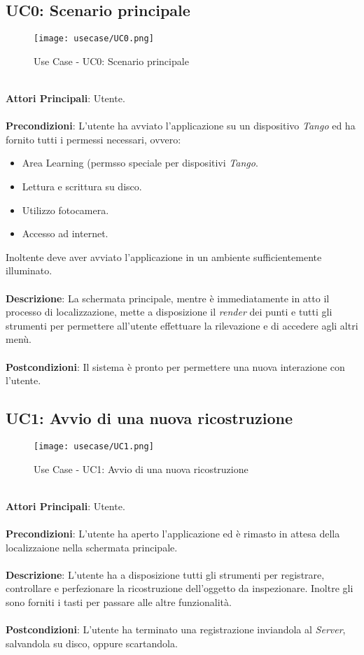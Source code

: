 \subsection{UC0: Scenario principale}
\begin{figure}[!h] 
    \centering 
    \texttt{[image: usecase/UC0.png]} 
    \caption{Use Case - UC0: Scenario principale}
\end{figure}
\ \\
\textbf{Attori Principali}: Utente.
\\\\ \textbf{Precondizioni}: L'utente ha avviato l'applicazione su un dispositivo \emph{Tango} ed ha fornito tutti i permessi necessari, ovvero:
\begin{itemize}
	\item Area Learning (permsso speciale per dispositivi \emph{Tango}.
	\item Lettura e scrittura su disco.
	\item Utilizzo fotocamera.
	\item Accesso ad internet.
\end{itemize}
Inoltente deve aver avviato l'applicazione in un ambiente sufficientemente illuminato.
\\\\ \textbf{Descrizione}: La schermata principale, mentre è immediatamente in atto il processo di localizzazione, mette a disposizione il \emph{render} dei punti e tutti gli strumenti per permettere all'utente effettuare la rilevazione e di accedere agli altri menù.
\\\\ \textbf{Postcondizioni}: Il sistema è pronto per permettere una nuova interazione con l'utente.


\subsection{UC1: Avvio di una nuova ricostruzione}
\begin{figure}[!h] 
    \centering 
    \texttt{[image: usecase/UC1.png]} 
    \caption{Use Case - UC1: Avvio di una nuova ricostruzione}
\end{figure}
\ \\
\textbf{Attori Principali}: Utente.
\\\\ \textbf{Precondizioni}: L'utente ha aperto l'applicazione ed è rimasto in attesa della localizzaione nella schermata principale.
\\\\ \textbf{Descrizione}: L'utente ha a disposizione tutti gli strumenti per registrare, controllare e perfezionare la ricostruzione dell'oggetto da inspezionare. Inoltre gli sono forniti i tasti per passare alle altre funzionalità. 
\\\\ \textbf{Postcondizioni}: L'utente ha terminato una registrazione inviandola al \emph{Server}, salvandola su disco, oppure scartandola.



